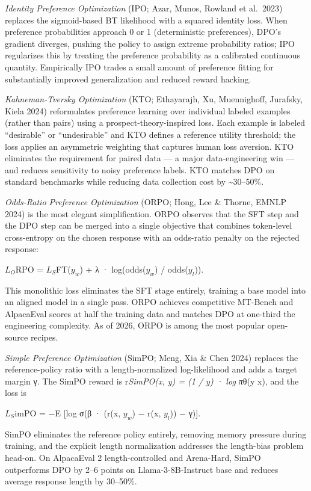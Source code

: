 \emph{Identity Preference Optimization} (IPO; Azar, Munos, Rowland et al.~2023) replaces the sigmoid-based BT likelihood with a squared identity loss. When preference probabilities approach 0 or 1 (deterministic preferences), DPO's gradient diverges, pushing the policy to assign extreme probability ratios; IPO regularizes this by treating the preference probability as a calibrated continuous quantity. Empirically IPO trades a small amount of preference fitting for substantially improved generalization and reduced reward hacking.

\emph{Kahneman-Tversky Optimization} (KTO; Ethayarajh, Xu, Muennighoff, Jurafsky, Kiela 2024) reformulates preference learning over individual labeled examples (rather than pairs) using a prospect-theory-inspired loss. Each example is labeled ``desirable'' or ``undesirable'' and KTO defines a reference utility threshold; the loss applies an asymmetric weighting that captures human loss aversion. KTO eliminates the requirement for paired data --- a major data-engineering win --- and reduces sensitivity to noisy preference labels. KTO matches DPO on standard benchmarks while reducing data collection cost by \textasciitilde30--50\%.

\emph{Odds-Ratio Preference Optimization} (ORPO; Hong, Lee \& Thorne, EMNLP 2024) is the most elegant simplification. ORPO observes that the SFT step and the DPO step can be merged into a single objective that combines token-level cross-entropy on the chosen response with an odds-ratio penalty on the rejected response:

\(L_O\)RPO = \(L_S\)FT(\(y_w\)) + λ · log(odds(\(y_w\)) / odds(\(y_l\))).

This monolithic loss eliminates the SFT stage entirely, training a base model into an aligned model in a single pass. ORPO achieves competitive MT-Bench and AlpacaEval scores at half the training data and matches DPO at one-third the engineering complexity. As of 2026, ORPO is among the most popular open-source recipes.

\emph{Simple Preference Optimization} (SimPO; Meng, Xia \& Chen 2024) replaces the reference-policy ratio with a length-normalized log-likelihood and adds a target margin γ. The SimPO reward is r\emph{SimPO(x, y) = (1 / \textbar y\textbar) · log π}θ(y \textbar{} x), and the loss is

\(L_S\)imPO = −E {[}log σ(β · (r(x, \(y_w\)) − r(x, \(y_l\))) − γ){]}.

SimPO eliminates the reference policy entirely, removing memory pressure during training, and the explicit length normalization addresses the length-bias problem head-on. On AlpacaEval 2 length-controlled and Arena-Hard, SimPO outperforms DPO by 2--6 points on Llama-3-8B-Instruct base and reduces average response length by 30--50\%.

